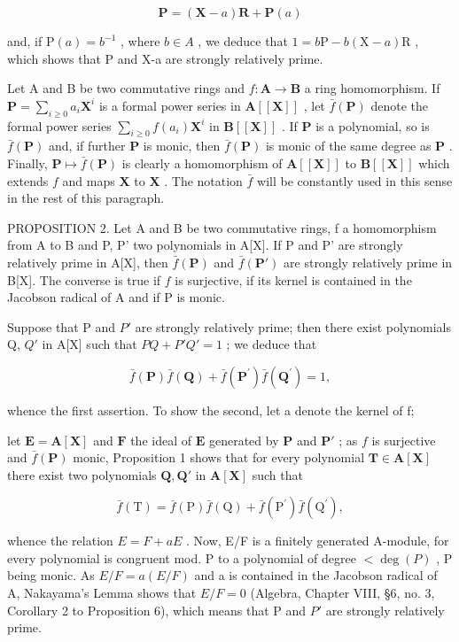 \[
\mathbf {P} = (\mathbf {X} - a) \mathbf {R} + \mathbf {P} (a)
\]

and, if \(\mathrm{P}(a)=b^{-1}\) , where \(b\in A\) , we deduce that \(1=b\mathrm{P}-b(\mathrm{X}-a)\mathrm{R}\) , which shows that P and X-a are strongly relatively prime.

Let A and B be two commutative rings and \(f\colon\mathbf{A}\to\mathbf{B}\) a ring homomorphism. If \(\mathbf{P}=\sum_{i\geqslant0}a_{i}\mathbf{X}^{i}\) is a formal power series in \(\mathbf{A}[[\mathbf{X}]]\) , let \(\bar{f}(\mathbf{P})\) denote the formal power series \(\sum_{i\geqslant0}f(a_{i})\mathbf{X}^{i}\) in \(\mathbf{B}[[\mathbf{X}]]\) . If \(\mathbf{P}\) is a polynomial, so is \(\bar{f}(\mathbf{P})\) and, if further \(\mathbf{P}\) is monic, then \(\bar{f}(\mathbf{P})\) is monic of the same degree as \(\mathbf{P}\) . Finally, \(\mathbf{P}\mapsto\bar{f}(\mathbf{P})\) is clearly a homomorphism of \(\mathbf{A}[[\mathbf{X}]]\) to \(\mathbf{B}[[\mathbf{X}]]\) which extends \(f\) and maps \(\mathbf{X}\) to \(\mathbf{X}\) . The notation \(\bar{f}\) will be constantly used in this sense in the rest of this paragraph.

PROPOSITION 2. Let A and B be two commutative rings, f a homomorphism from A to B and P, P' two polynomials in A{[}X{]}. If P and P' are strongly relatively prime in A{[}X{]}, then \(\bar{f}(\mathbf{P})\) and \(\bar{f}(\mathbf{P}')\) are strongly relatively prime in B{[}X{]}. The converse is true if \(f\) is surjective, if its kernel is contained in the Jacobson radical of A and if P is monic.

Suppose that P and \(P'\) are strongly relatively prime; then there exist polynomials Q, \(Q'\) in A{[}X{]} such that \(PQ + P'Q' = 1\) ; we deduce that

\[
\bar {f} (\mathbf {P}) \bar {f} (\mathbf {Q}) + \bar {f} (\mathbf {P} ^ {\prime}) \bar {f} (\mathbf {Q} ^ {\prime}) = 1,
\]

whence the first assertion. To show the second, let a denote the kernel of f;

let \(\mathbf{E} = \mathbf{A}[\mathbf{X}]\) and \(\mathbf{F}\) the ideal of \(\mathbf{E}\) generated by \(\mathbf{P}\) and \(\mathbf{P}'\) ; as \(f\) is surjective and \(\bar{f}(\mathbf{P})\) monic, Proposition 1 shows that for every polynomial \(\mathbf{T} \in \mathbf{A}[\mathbf{X}]\) there exist two polynomials \(\mathbf{Q}, \mathbf{Q}'\) in \(\mathbf{A}[\mathbf{X}]\) such that

\[
\bar {f} (\mathrm{T}) = \bar {f} (\mathrm{P}) \bar {f} (\mathrm{Q}) + \bar {f} (\mathrm{P} ^ {\prime}) \bar {f} (\mathrm{Q} ^ {\prime}),
\]

whence the relation \(E = F + aE\) . Now, E/F is a finitely generated A-module, for every polynomial is congruent mod. P to a polynomial of degree \(<\deg(P)\) , P being monic. As \(E/F = a(E/F)\) and a is contained in the Jacobson radical of A, Nakayama's Lemma shows that \(E/F = 0\) (Algebra, Chapter VIII, §6, no. 3, Corollary 2 to Proposition 6), which means that P and \(P'\) are strongly relatively prime.

